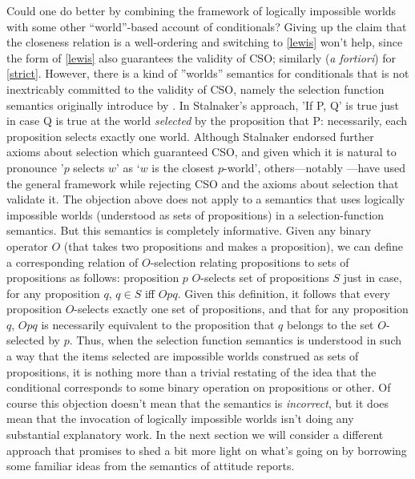 \documentclass[If.tex]{subfiles}
\begin{document}
Could one do better by combining the framework of logically impossible worlds with some other “world”-based account of conditionals?  Giving up the claim that the closeness relation is a well-ordering and switching to \ref{lewis} won't help, since the form of \ref{lewis} also guarantees the validity of CSO; similarly (\emph{a fortiori}) for \ref{strict}.  However, there is a kind of ”worlds” semantics for conditionals that is not inextricably committed to the validity of CSO, namely the selection function semantics originally introduce by \citet{StalnakerTC}.  In Stalnaker's approach, ’If P, Q’ is true just in case Q is true at the world \emph{selected} by the proposition that P: necessarily, each proposition selects exactly one world.  Although Stalnaker endorsed further axioms about selection which guaranteed CSO, and given which it is natural to pronounce ’$p$ selects $w$’ as ‘$w$ is the closest $p$-world’, others---notably \cite{BaconSTC}---have used the general framework while rejecting CSO and the axioms about selection that validate it.  The objection above does not apply to a semantics that uses logically impossible worlds (understood as sets of propositions) in a selection-function semantics.  But this semantics is completely informative.  Given any binary operator $O$ (that takes two propositions and makes a proposition), we can define a corresponding relation of $O$-selection relating propositions to sets of propositions as follows: proposition $p$ $O$-selects set of propositions $S$ just in case, for any proposition $q$, $q∈S$ iff $Opq$.  Given this definition, it follows that every proposition $O$-selects exactly one set of propositions, and that for any proposition $q$, $Opq$ is necessarily equivalent to the proposition that $q$ belongs to the set $O$-selected by $p$.  Thus, when the selection function semantics is understood in such a way that the items selected are impossible worlds construed as sets of propositions, it is nothing more than a trivial restating of the idea that the conditional corresponds to some binary operation on propositions or other.  Of course this objection doesn't mean that the semantics is \emph{incorrect}, but it does mean that the invocation of logically impossible worlds isn't doing any substantial explanatory work.  In the next section we will consider a different approach that promises to shed a bit more light on what's going on by borrowing some familiar ideas from the semantics of attitude reports.  


\end{document}
